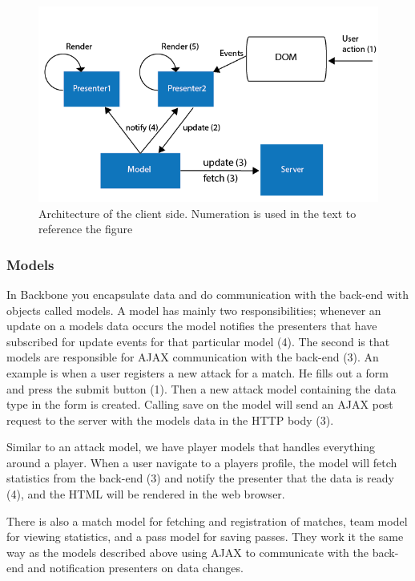 
\begin{figure}[ht!]
\centering
\includegraphics[width=1\textwidth]{images/architecture/backbone_architecture.png}
\caption{Architecture of the client side. Numeration is used in the text to reference the figure}
\label{fig:backbone_architecture}
\end{figure}

\subsubsection{Models}

In Backbone you encapsulate data and do communication with the back-end with objects called models. A model has mainly two responsibilities; whenever an update on a models data occurs the model notifies the presenters that have subscribed for update events for that particular model (4). The second is that models are responsible for \ac{AJAX} communication with the back-end (3). An example is when a user registers a new attack for a match. He fills out a form and press the submit button (1). Then a new attack model containing the data type in the form is created. Calling save on the model will send an \ac{AJAX} post request to the server with the models data in the \ac{HTTP} body (3).

Similar to an attack model, we have player models that handles everything around a player. When a user navigate to a players profile, the model will fetch statistics from the back-end (3) and notify the presenter that the data is ready (4), and the \ac{HTML} will be rendered in the web browser.

There is also a match model for fetching and registration of matches, team model for viewing statistics, and a pass model for saving passes. They work it the same way as the models described above using \ac{AJAX} to communicate with the back-end and notification presenters on data changes.

